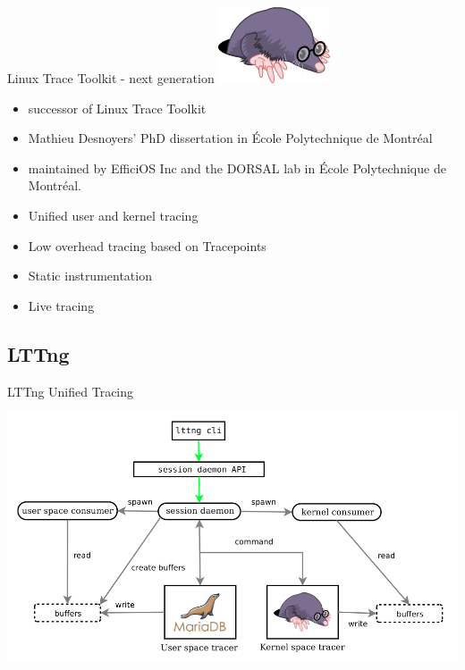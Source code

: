 \begin{frame}{Linux Trace Toolkit - next generation}
\includegraphics[scale=0.08]{images/lttng-logo.png}
\begin{itemize}
\item successor of Linux Trace Toolkit
\item Mathieu Desnoyers' PhD dissertation  in École Polytechnique de Montréal
\item maintained by EfficiOS Inc and the DORSAL lab in École Polytechnique de
Montréal.
\item Unified user and kernel tracing
\item Low overhead tracing based on Tracepoints
\item Static instrumentation
\item Live tracing
\end{itemize}
\end{frame}

\subsection{LTTng}

\begin{frame}{LTTng Unified Tracing}
\begin{center}
\includegraphics[scale=0.3]{images/lttng-arch.png}
\end{center}
\end{frame}

